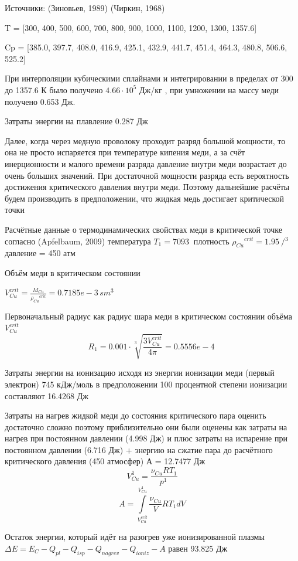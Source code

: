 \documentclass[12pt]{article}
\begin{document}
Источники: (Зиновьев, 1989)  (Чиркин, 1968)

T   = [300,     400,    500,    600,    700,     800,    900,    1000,   1100,  1200,  1300, 1357.6]

Cp = [385.0, 397.7, 408.0, 416.9, 425.1, 432.9, 441.7, 451.4, 464.3, 480.8, 506.6, 525.2] 

При интерполяции кубическими сплайнами и интегрировании в пределах от 300 до 1357.6 К было получено $4.66\cdot {{10}^{5}}$ Дж/кг , при умножении на массу меди получено 0.653 Дж. 

Затраты энергии на плавление 0.287 Дж

Далее, когда через медную проволоку проходит разряд большой мощности, то она не просто испаряется при температуре кипения меди, а за счёт инерционности и малого времени разряда давление внутри меди возрастает до очень больших значений. При достаточной мощности разряда есть вероятность достижения критического давления внутри меди.  Поэтому дальнейшие расчёты будем производить в предположении, что жидкая медь достигает критической точки

Расчётные данные о термодинамических свойствах меди в критической точке согласно (Apfelbaum, 2009) температура ${{T}_{1}}=7093\ $ плотность ${{\rho }_{Cu}}^{crit}=1.95\ {}/{{{}^{3}}}$ давление = 450 атм

Объём меди в критическом состоянии

$V_{Cu}^{crit}=\frac{{{M}_{Cu}}}{{{\rho }_{Cu}}^{crit}}={0.7185e-3}\,{sm}^{3}$

Первоначальный радиус как радиус шара меди в критическом состоянии объёма $V_{Cu}^{crit}$
$${{R}_{1}}=0.001\cdot \sqrt[3]{\frac{3V_{Cu}^{crit}}{4\pi }}={0.5556e-4}\ $$ 

Затраты энергии на ионизацию исходя из энергии ионизации меди (первый электрон) 745 кДж/моль в предположении 100 процентной степени ионизации составляют 16.4268 Дж

Затраты на нагрев жидкой меди до состояния критического пара оценить достаточно сложно поэтому приблизительно они были оценены как затраты на нагрев при постоянном давлении (4.998 Дж) и плюс затраты на испарение при постоянном давлении (6.716 Дж) + энергию на сжатие пара до расчётного критического давления (450 атмосфер) А = 12.7477 Дж
$$V_{Cu}^{1\ }=\frac{{{\nu }_{Cu}}R{{T}_{1}}}{{{p}^{1\ }}}$$
$$A=\int\limits_{V_{Cu}^{crit}}^{V_{Cu}^{1\ }}{\frac{{{\nu }_{Cu}}}{V}R{{T}_{1}}dV}$$

Остаток энергии, который идёт на разогрев уже ионизированной плазмы
$\Delta E={{E}_{C}}-{{Q}_{pl}}-{{Q}_{isp}}-{{Q}_{nagrev}}-{{Q}_{ioniz}}-A$ 
равен 93.825 Дж
\end{document}

